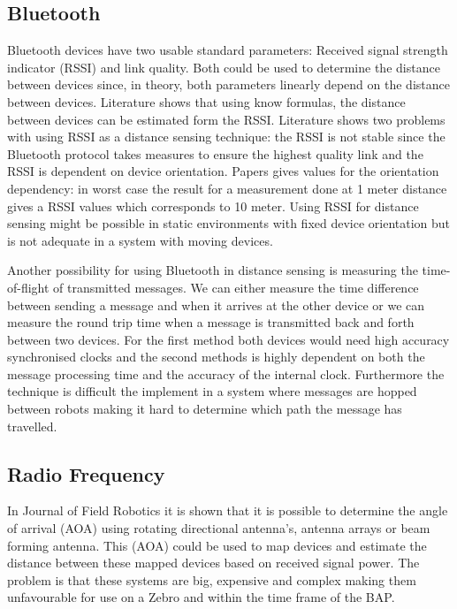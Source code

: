 \subsection*{Bluetooth}

Bluetooth devices have two usable standard parameters: Received signal strength indicator (RSSI) and link quality. Both could be used to determine the distance between devices since, in theory, both parameters linearly depend on the distance between devices. Literature shows that using know formulas, the distance between devices can be estimated form the RSSI. Literature \cite{Forno2005} shows two problems with using RSSI as a distance sensing technique: the RSSI is not stable since the Bluetooth protocol takes measures to ensure the highest quality link and the RSSI is dependent on device orientation. Papers \cite{Scheerens2012,Dahlgren2014} gives values for the orientation dependency: in worst case the result for a measurement done at 1 meter distance gives a RSSI values which corresponds to 10 meter. Using RSSI for distance sensing might be possible in static environments with fixed device orientation but is not adequate in a system with moving devices.

Another possibility for using Bluetooth in distance sensing is measuring the time-of-flight of transmitted messages. We can either measure the time difference between sending a message and when it arrives at the other device or we can measure the round trip time when a message is transmitted back and forth between two devices. For the first method both devices would need high accuracy synchronised clocks \cite{Ekberg2009} and the second methods is highly dependent on both the message processing time and the accuracy of the internal clock. Furthermore the technique is difficult the implement in a system where messages are hopped between robots making it hard to determine which path the message has travelled.

\subsection*{Radio Frequency}

In Journal of Field Robotics \cite{Min2016} it is shown that it is possible to determine the angle of arrival (AOA) using rotating directional antenna's, antenna arrays or beam forming antenna. This (AOA) could be used to map devices and estimate the distance between these mapped devices based on received signal power. The problem is that these systems are big, expensive and complex making them unfavourable for use on a Zebro and within the time frame of the BAP.

